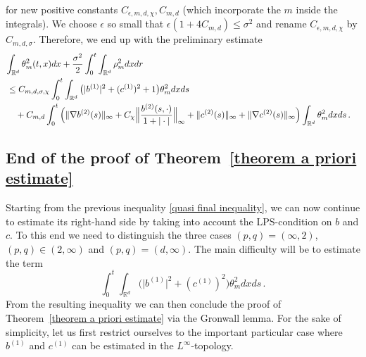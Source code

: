 \documentclass[a4paper,10pt]{article}
\begin{document}
for new positive constants $C_{\epsilon,m,d,\chi},C_{m,d}$ (which incorporate the $m$ inside the integrals). We choose $\epsilon$ so small
that $\epsilon(1+4C_{m,d})  \leq\sigma^{2}$ and rename $C_{\epsilon,m,d,\chi}$ by $C_{m,d,\sigma}$. Therefore, we end up with the preliminary estimate
\begin{align}
\label{quasi final inequality}
\lefteqn{ \int_{\mathbb{R}^{d}}\theta_{m}^{2}(t,x)dx+\frac{\sigma^{2}}{2}\int_{0} 
^{t}\int_{\mathbb{R}^{d}}\rho_{m}^{2}dxdr } \\
&  \leq C_{m,d,\sigma,\chi} \int_{0}^{t} \int_{\mathbb{R}^{d}} \big(\vert b^{(1)}\vert ^{2}+(c^{(1)})^{2} +1\big) \theta_{m}^{2} dxds \nonumber \\
& \quad {} +C_{m,d} \int_{0}^{t} \Big( \Vert \nabla b^{(2)}(s)  \Vert _{\infty}+C_{\chi} \Big\Vert \frac{b^{(2)}(s,\cdot)}{1+\vert \cdot\vert } \Big\Vert_{\infty}+ \Vert c^{(2)}(s)  \Vert _{\infty}+\Vert \nabla c^{(2)}(s) \Vert_{\infty} \Big) \int_{\mathbb{R}^{d}} \theta_{m}^{2} dxds \,. \nonumber
\end{align}

\subsection{End of the proof of Theorem~\ref{theorem a priori estimate}}

Starting from the previous inequality \eqref{quasi final inequality}, we can now continue to estimate its right-hand side by taking into account the LPS-condition on $b$ and $c$. To this end we need to distinguish the three cases $(p,q)=(\infty,2)$, $(p,q) \in (2,\infty)$ and $(p,q) =(d,\infty)$. The main difficulty will be to estimate the term
\begin{equation*}
\int_{0}^{t} \int_{\mathbb{R}^{d}} \big(\vert b^{(1)}\vert ^{2}+(c^{(1)})^{2} \big) \theta_{m}^{2} dxds \,.
\end{equation*}
From the resulting inequality we can then conclude the proof of Theorem~\ref{theorem a priori estimate} via the Gronwall lemma. For the sake of simplicity, let us first restrict ourselves to the important particular case where $b^{(1)}$ and $c^{(1)}$ can be estimated in the $L^{\infty}$-topology.
\end{document}
